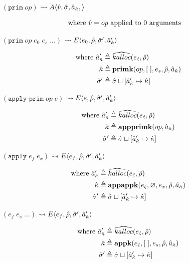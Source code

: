 \documentclass[12pt,draft]{article}
\newcommand{\primsyn}[2]{(\texttt{prim}\;#1\;#2\;...)}
\newcommand{\singleprimsyn}[1]{(\texttt{prim}\;#1)}
\newcommand{\applyprimsyn}[2]{(\texttt{apply-prim}\;#1\;#2)}
\newcommand{\applysyn}[2]{(\texttt{apply}\;#1\;#2)}
\newcommand{\E}[4]{E\langle #1 , #2 , #3 , #4 \rangle}
\newcommand{\A}[4]{A\langle #1 , #2 , #3 , #4 \rangle}
\begin{document}
{\begin{multicols*}{2}
\begin{center}
  $\singleprimsyn{op}$
  $\leadsto \A{\aval}{\astore}{\akaddr}{}$
\end{center}
\vspace{-7mm}
\begin{align*}
\text{where } \hat{v} &= op \text{ applied to } 0 \text{ arguments}
\end{align*}
\begin{center}
  $\primsyn{op}{e_0\;e_s}$
  $\leadsto \E{e_0}{\aenv}{\astore'}{\akaddr'}$
\end{center}
\vspace{-7mm}
\begin{align*}
  \text{where }
  \hat{a}_{\hat{\kappa}}' &\triangleq \widehat{kalloc}(e_{\hat{\varsigma}} , \hat{\rho}) \\
  \hat{\kappa} &\triangleq \textbf{primk}(op , [\;] , e_s , \hat{\rho} , \hat{a}_{\hat{\kappa}}) \\
  \hat{\sigma}' &\triangleq \hat{\sigma} \sqcup [\hat{a}_{\hat{\kappa}}' \mapsto \hat{\kappa}]
\end{align*}
\begin{center}
  $\applyprimsyn{op}{e}$
  $\leadsto \E{e}{\aenv}{\astore'}{\akaddr'}$
\end{center}
\vspace{-7mm}
\begin{align*}
  \text{where }
  \hat{a}_{\hat{\kappa}}' &\triangleq \widehat{kalloc}(e_{\hat{\varsigma}} , \hat{\rho}) \\
  \hat{\kappa} &\triangleq \textbf{appprimk}(op, \hat{a}_{\hat{\kappa}}) \\
  \hat{\sigma}' &\triangleq \hat{\sigma} \sqcup [\hat{a}_{\hat{\kappa}}' \mapsto \hat{\kappa}]
\end{align*}
\begin{center}
  $\applysyn{e_f}{e_x}$
  $\leadsto \E{e_f}{\aenv}{\astore'}{\akaddr'}$
\end{center}
\vspace{-7mm}
\begin{align*}
  \text{where }
  \hat{a}_{\hat{\kappa}}' &\triangleq \widehat{kalloc}(e_{\hat{\varsigma}} , \hat{\rho}) \\
  \hat{\kappa} &\triangleq \textbf{appappk}(e_{\hat{\varsigma}},\varnothing , e_x , \hat{\rho} , \hat{a}_{\hat{\kappa}}) \\
  \hat{\sigma}' &\triangleq \hat{\sigma} \sqcup [\hat{a}_{\hat{\kappa}}' \mapsto \hat{\kappa}]
\end{align*}
\begin{center}
  $(e_f\;e_s\;...)$
  $\leadsto \E{e_f}{\aenv}{\astore'}{\akaddr'}$
\end{center}
\vspace{-7mm}
\begin{align*}
  \text{where }
  \hat{a}_{\hat{\kappa}}' &\triangleq \widehat{kalloc}(e_{\hat{\varsigma}} , \hat{\rho}) \\
  \hat{\kappa} &\triangleq \textbf{appk}(e_{\hat{\varsigma}} , [\;] , e_s , \hat{\rho} , \hat{a}_{\hat{\kappa}}) \\
  \hat{\sigma}' &\triangleq \hat{\sigma} \sqcup [\hat{a}_{\hat{\kappa}}' \mapsto \hat{\kappa}]
\end{align*}
\end{multicols*}
}
\end{document}
